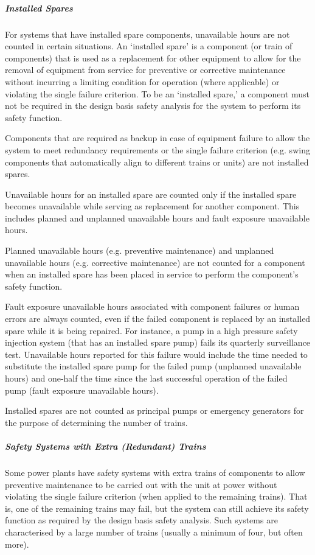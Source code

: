 \subparagraph{Installed Spares}

For systems that have installed spare components, unavailable hours
are not counted in certain situations. An ‘installed spare’ is a
component (or train of components) that is used as a replacement for
other equipment to allow for the removal of equipment from service for
preventive or corrective maintenance without incurring a limiting
condition for operation (where applicable) or violating the single
failure criterion. To be an ‘installed spare,’ a component must not be
required in the design basis safety analysis for the system to perform
its safety function.

Components that are required as backup in case of equipment failure to
allow the system to meet redundancy requirements or the single failure
criterion (e.g. swing components that automatically align to different
trains or units) are not installed spares.

Unavailable hours for an installed spare are counted only if the
installed spare becomes unavailable while serving as replacement for
another component. This includes planned and unplanned unavailable
hours and fault exposure unavailable hours.

Planned unavailable hours (e.g. preventive maintenance) and unplanned
unavailable hours (e.g. corrective maintenance) are not counted for a
component when an installed spare has been placed in service to
perform the component's safety function.

Fault exposure unavailable hours associated with component failures or
human errors are always counted, even if the failed component is
replaced by an installed spare while it is being repaired. For
instance, a pump in a high pressure safety injection system (that has
an installed spare pump) fails its quarterly surveillance
test. Unavailable hours reported for this failure would include the
time needed to substitute the installed spare pump for the failed pump
(unplanned unavailable hours) and one-half the time since the last
successful operation of the failed pump (fault exposure unavailable
hours).

Installed spares are not counted as principal pumps or emergency
generators for the purpose of determining the number of trains.

\subparagraph{Safety Systems with Extra (Redundant) Trains}

Some power plants have safety systems with extra trains of components
to allow preventive maintenance to be carried out with the unit at
power without violating the single failure criterion (when applied to
the remaining trains). That is, one of the remaining trains may fail,
but the system can still achieve its safety function as required by
the design basis safety analysis. Such systems are characterised by a
large number of trains (usually a minimum of four, but often more).

